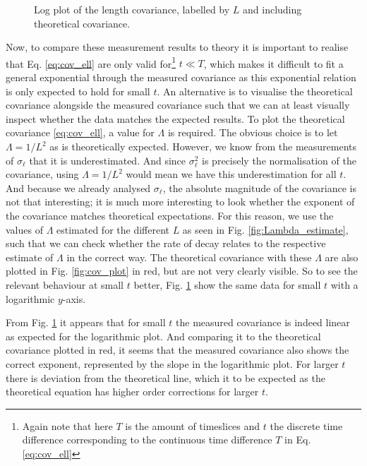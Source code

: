 \begin{figure}[ht]
\begin{minipage}[t]{0.49\linewidth}
        \caption{Log plot of the length covariance, labelled by $L$ and including theoretical covariance.}
        \label{fig:cov_log_plot}
    \end{minipage}
\end{figure}

Now, to compare these measurement results to theory it is important to realise that Eq. \eqref{eq:cov_ell} are only valid for\footnote{Again note that here $T$ is the amount of timeslices and $t$ the discrete time difference corresponding to the continuous time difference $T$ in Eq. \eqref{eq:cov_ell}} $t \ll T$, which makes it difficult to fit a general exponential through the measured covariance as this exponential relation is only expected to hold for small $t$.
An alternative is to visualise the theoretical covariance alongside the measured covariance such that we can at least visually inspect whether the data matches the expected results.
To plot the theoretical covariance \eqref{eq:cov_ell}, a value for $\Lambda$ is required.
The obvious choice is to let $\Lambda = 1/L^2$ as is theoretically expected.
However, we know from the measurements of $\sigma_\ell$ that it is underestimated. And since $\sigma_\ell^2$ is precisely the normalisation of the covariance, using $\Lambda = 1/L^2$ would mean we have this underestimation for all $t$.
And because we already analysed $\sigma_\ell$, the absolute magnitude of the covariance is not that interesting; it is much more interesting to look whether the exponent of the covariance matches theoretical expectations.
For this reason, we use the values of $\Lambda$ estimated for the different $L$ as seen in Fig. \ref{fig:Lambda_estimate}, such that we can check whether the rate of decay relates to the respective estimate of $\Lambda$ in the correct way.
The theoretical covariance with these $\Lambda$ are also plotted in Fig. \ref{fig:cov_plot} in red, but are not very clearly visible.
So to see the relevant behaviour at small $t$ better, Fig. \ref{fig:cov_log_plot} show the same data for small $t$ with a logarithmic $y$-axis.

From Fig. \ref{fig:cov_log_plot} it appears that for small $t$ the measured covariance is indeed linear as expected for the logarithmic plot. And comparing it to the theoretical covariance plotted in red, it seems that the measured covariance also shows the correct exponent, represented by the slope in the logarithmic plot.
For larger $t$ there is deviation from the theoretical line, which it to be expected as the theoretical equation has higher order corrections for larger $t$.

